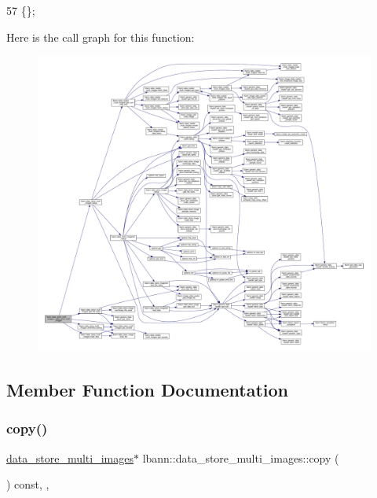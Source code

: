 \begin{DoxyCode}
57 \{\};
\end{DoxyCode}
Here is the call graph for this function\+:\nopagebreak
\begin{figure}[H]
\begin{center}
\leavevmode
\includegraphics[width=350pt]{classlbann_1_1data__store__multi__images_addafae542acaa1ef218759030719b6d3_cgraph}
\end{center}
\end{figure}


\subsection{Member Function Documentation}
\mbox{\label{classlbann_1_1data__store__multi__images_a1046efda9448bab9b42e9fcdf71e03f1}} 
\subsubsection{\texorpdfstring{copy()}{copy()}}
{\footnotesize\ttfamily \hyperlink{classlbann_1_1data__store__multi__images}{data\+\_\+store\+\_\+multi\+\_\+images}$\ast$ lbann\+::data\+\_\+store\+\_\+multi\+\_\+images\+::copy (\begin{DoxyParamCaption}{ }\end{DoxyParamCaption}) const\hspace{0.3cm}{\ttfamily [inline]}, {\ttfamily [override]}, {\ttfamily [virtual]}}



